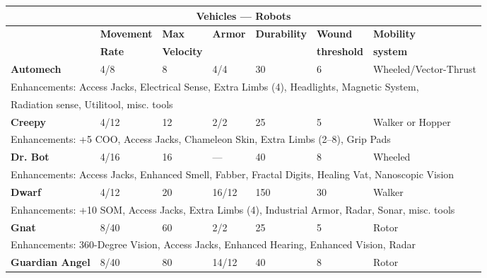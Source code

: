 \begin{table} \begin{tabular}{|l|l|l|l|l|l|l|} \hline

\multicolumn{7}{|c|}{\textbf{Vehicles --- Robots}} \\ \hline

&\textbf{Movement}	&\textbf{Max}	&\textbf{Armor}	&\textbf{Durability}	&\textbf{Wound}	&\textbf{Mobility} \\ &\textbf{Rate}	&\textbf{Velocity}	&&&\textbf{threshold}	&\textbf{system} \\ \hline

\textbf{Automech}	&4/8	&8	&4/4	&30	&6	&Wheeled/Vector-Thrust \\ \hline

\multicolumn{7}{|l|}{Enhancements: Access Jacks, Electrical Sense, Extra Limbs (4), Headlights, Magnetic System, } \\ \multicolumn{7}{|l|}{Radiation sense, Utilitool, misc. tools} \\ \hline

\textbf{Creepy}	&4/12	&12	&2/2	&25	&5	&Walker or Hopper \\ \hline

\multicolumn{7}{|l|}{Enhancements: +5 COO, Access Jacks, Chameleon Skin, Extra Limbs (2--8), Grip Pads} \\ \hline

\textbf{Dr. Bot}	&4/16	&16	&--- &40	&8	&Wheeled \\ \hline

\multicolumn{7}{|l|}{Enhancements: Access Jacks, Enhanced Smell, Fabber, Fractal Digits, Healing Vat, Nanoscopic Vision} \\ \hline

\textbf{Dwarf}	&4/12	&20	&16/12	&150	&30	&Walker \\ \hline

\multicolumn{7}{|l|}{Enhancements: +10 SOM, Access Jacks, Extra Limbs (4), Industrial Armor, Radar, Sonar, misc. tools} \\ \hline

\textbf{Gnat}	&8/40	&60	&2/2	&25	&5	&Rotor \\ \hline

\multicolumn{7}{|l|}{Enhancements: 360-Degree Vision, Access Jacks, Enhanced Hearing, Enhanced Vision, Radar} \\ \hline

\textbf{Guardian Angel}	&8/40	&80	&14/12	&40	&8	&Rotor \\ \hline


\end{tabular}
\end{table}
